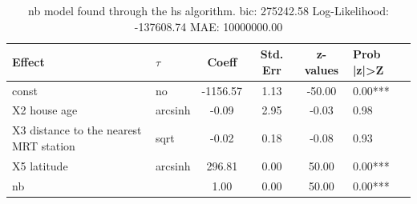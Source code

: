 \begin{table}
	\caption{nb model found through the hs algorithm. bic: 275242.58 Log-Likelihood: -137608.74 MAE: 10000000.00}
	\begin{center}
		\begin{tabular}{|l|l|c|c|c|l|}
			\hline
			Effect & $\tau$ & Coeff & Std. Err & z-values & Prob |z|>Z \\
			\hline
			const & no & -1156.57 & 1.13 & -50.00 & 0.00*** \\
			\hline
			X2 house age & arcsinh & -0.09 & 2.95 & -0.03 & 0.98 \\
			\hline
			X3 distance to the nearest MRT station & sqrt & -0.02 & 0.18 & -0.08 & 0.93 \\
			\hline
			X5 latitude & arcsinh & 296.81 & 0.00 & 50.00 & 0.00*** \\
			\hline
			nb &  & 1.00 & 0.00 & 50.00 & 0.00*** \\
			\hline
		\end{tabular}
	\end{center}
\end{table}